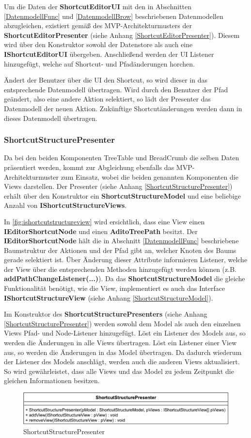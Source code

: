 Um die Daten der \textbf{ShortcutEditorUI} mit den in Abschnitten \ref{DatenmodellFunc} und \ref{DatenmodellBrow} beschriebenen Datenmodellen abzugleichen, existiert gemäß des MVP-Architekturmusters der \textbf{ShortcutEditorPresenter} (siehe Anhang \ref{ShortcutEditorPresenter}). Diesem wird über den Konstruktor sowohl der Datenstore als auch eine \textbf{IShortcutEditorUI} übergeben. Anschließend werden der UI Listener hinzugefügt, welche auf Shortcut- und Pfadänderungen horchen.

Ändert der Benutzer über die UI den Shortcut, so wird dieser in das entsprechende Datenmodell übertragen. Wird durch den Benutzer der Pfad geändert, also eine andere Aktion selektiert, so lädt der Presenter das Datenmodell der neuen Aktion. Zukünftige Shortcutänderungen werden dann in dieses Datenmodell übertragen.

\subsubsection{ShortcutStructurePresenter}

Da bei den beiden Komponenten TreeTable und BreadCrumb die selben Daten präsentiert werden, kommt zur Abgleichung ebenfalls das MVP-Architekturmuster zum Einsatz, wobei die beiden genannten Komponenten die Views darstellen. Der Presenter (siehe Anhang \ref{ShortcutStructurePresenter}) erhält über den Konstruktor ein \textbf{ShortcutStructureModel} und eine beliebige Anzahl von \textbf{IShortcutStructureViews}. 

In \autoref{fig:ishortcutstructureview} wird ersichtlich, dass eine View einen \textbf{IEditorShortcutNode} und einen \textbf{AditoTreePath} besitzt. Der \textbf{IEditorShortcutNode} hält die in Abschnitt \ref{DatenmodellFunc} beschriebene Baumstruktur der Aktionen und der Pfad gibt an, welcher Knoten des Baums gerade selektiert ist. Über Änderung dieser Attribute informieren Listener, welche der View über die entsprechenden Methoden hinzugefügt werden können (z.B. \textbf{addPathChangeListener(...)}). Da das \textbf{ShortcutStructureModel} die gleiche Funktionalität benötigt, wie die View, implementiert es auch das Interface \textbf{IShortcutStructureView} (siehe Anhang \ref{ShortcutStructureModel}).

Im Konstruktor des \textbf{ShortcutStructurePresenters} (siehe Anhang \ref{ShortcutStructurePresenter}) werden sowohl dem Model als auch den einzelnen Views Pfad- und Node-Listener hinzugefügt. Löst ein Listener des Models aus, so werden die Änderungen in alle Views übertragen. Löst ein Listener einer View aus, so werden die Änderungen in das Model übertragen. Da dadurch wiederum der Listener des Models anschlägt, werden auch die anderen Views aktualisiert. So wird gewährleistet, dass alle Views und das Model zu jedem Zeitpunkt die gleichen Informationen besitzen.

\begin{figure}[H]
	\centering
	\includegraphics[width=0.6\linewidth]{../graphic/diagrams/CD_ShortcutStructurePresenter/ShortcutStructurePresenter}
	\caption{ShortcutStructurePresenter}
	\label{fig:shortcutstructurepresenter}
\end{figure}

\newpage